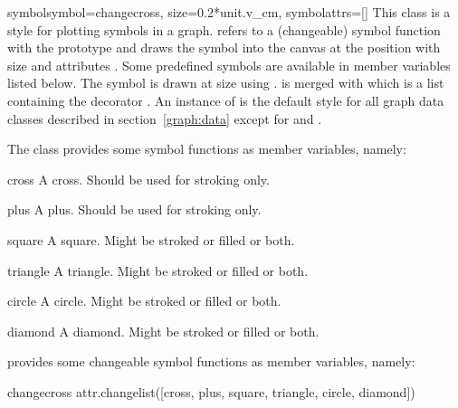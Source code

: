 \begin{classdesc}{symbol}{symbol=changecross, size=0.2*unit.v\_cm, %
                          symbolattrs=[]}
  This class is a style for plotting symbols in a graph.
   refers to a (changeable) symbol function with the
  prototype  and draws
  the symbol into the canvas  at the position  with size  and attributes . Some
  predefined symbols are available in member variables listed below.
  The symbol is drawn at size  using .
   is merged with  which is
  a list containing the decorator . An instance of
   is the default style for all graph data classes
  described in section~\ref{graph:data} except for 
  and .
\end{classdesc}

The class  provides some symbol functions as member
variables, namely:

\begin{memberdesc}{cross}
  A cross. Should be used for stroking only.
\end{memberdesc}

\begin{memberdesc}{plus}
  A plus. Should be used for stroking only.
\end{memberdesc}

\begin{memberdesc}{square}
  A square. Might be stroked or filled or both.
\end{memberdesc}

\begin{memberdesc}{triangle}
  A triangle. Might be stroked or filled or both.
\end{memberdesc}

\begin{memberdesc}{circle}
  A circle. Might be stroked or filled or both.
\end{memberdesc}

\begin{memberdesc}{diamond}
  A diamond. Might be stroked or filled or both.
\end{memberdesc}

 provides some changeable symbol functions as member
variables, namely:

\begin{memberdesc}{changecross}
  attr.changelist([cross, plus, square, triangle, circle, diamond])
\end{memberdesc}

